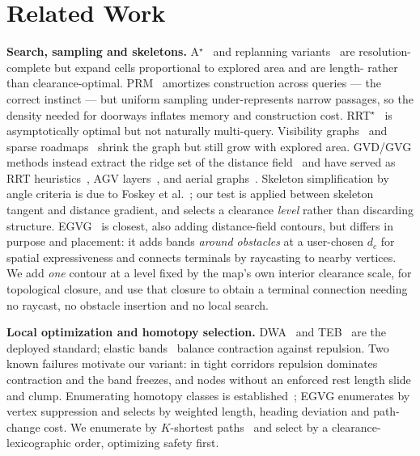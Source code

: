 \documentclass[conference]{IEEEtran}
\begin{document}
\section{Related Work}

\textbf{Search, sampling and skeletons.} A$^\star$~\cite{hart1968} and replanning variants~\cite{koenig2005} are resolution-complete but expand cells proportional to explored area and are length- rather than clearance-optimal. PRM~\cite{kavraki1996} amortizes construction across queries --- the correct instinct --- but uniform sampling under-represents narrow passages, so the density needed for doorways inflates memory and construction cost. RRT$^\star$~\cite{karaman2011,lavalle1998} is asymptotically optimal but not naturally multi-query. Visibility graphs~\cite{yang2022far} and sparse roadmaps~\cite{dobson2014} shrink the graph but still grow with explored area. GVD/GVG methods instead extract the ridge set of the distance field~\cite{lau2013,hoff1999} and have served as RRT heuristics~\cite{chi2022}, AGV layers~\cite{zhang2024agv}, and aerial graphs~\cite{oleynikova2018}. Skeleton simplification by angle criteria is due to Foskey et al.~\cite{foskey2003}; our test is applied between skeleton tangent and distance gradient, and selects a clearance \emph{level} rather than discarding structure. EGVG~\cite{qi2025egvg} is closest, also adding distance-field contours, but differs in purpose and placement: it adds bands \emph{around obstacles} at a user-chosen $d_c$ for spatial expressiveness and connects terminals by raycasting to nearby vertices. We add \emph{one} contour at a level fixed by the map's own interior clearance scale, for topological closure, and use that closure to obtain a terminal connection needing no raycast, no obstacle insertion and no local search.




\textbf{Local optimization and homotopy selection.} DWA~\cite{fox1997} and TEB~\cite{rosmann2012} are the deployed standard; elastic bands~\cite{quinlan1993} balance contraction against repulsion. Two known failures motivate our variant: in tight corridors repulsion dominates contraction and the band freezes, and nodes without an enforced rest length slide and clump. Enumerating homotopy classes is established~\cite{bhattacharya2012,qi2025egvg}; EGVG enumerates by vertex suppression and selects by weighted length, heading deviation and path-change cost. We enumerate by $K$-shortest paths~\cite{yen1971} and select by a clearance-lexicographic order, optimizing safety first.
\end{document}
